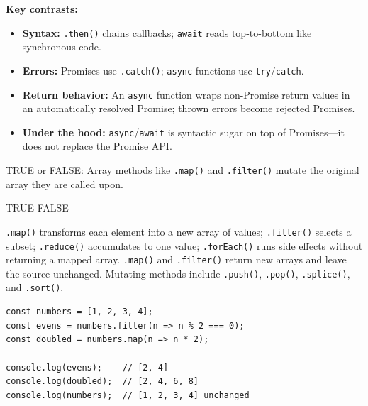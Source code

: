 \begin{solutionorbox}[4.75in]
\textbf{Key contrasts:}
\begin{itemize}
  \item \textbf{Syntax:} \lstinline[style=jsinline]|.then()| chains callbacks; \lstinline[style=jsinline]|await| reads top-to-bottom like synchronous code.
  \item \textbf{Errors:} Promises use \lstinline[style=jsinline]|.catch()|; \lstinline[style=jsinline]|async| functions use \lstinline[style=jsinline]|try|/\lstinline[style=jsinline]|catch|.
  \item \textbf{Return behavior:} An \lstinline[style=jsinline]|async| function wraps non-Promise return values in an automatically resolved Promise; thrown errors become rejected Promises.
  \item \textbf{Under the hood:} \lstinline[style=jsinline]|async|/\lstinline[style=jsinline]|await| is syntactic sugar on top of Promises---it does not replace the Promise API.
\end{itemize}
\end{solutionorbox}

\question[4]
TRUE or FALSE: Array methods like \lstinline[style=jsinline]|.map()| and \lstinline[style=jsinline]|.filter()| mutate the original array they are called upon.
\begin{choices}
  \choice TRUE
  \CorrectChoice FALSE
\end{choices}
\begin{solution}
  \lstinline[style=jsinline]|.map()| transforms each element into a new array of values; \lstinline[style=jsinline]|.filter()| selects a subset; \lstinline[style=jsinline]|.reduce()| accumulates to one value; \lstinline[style=jsinline]|.forEach()| runs side effects without returning a mapped array. \lstinline[style=jsinline]|.map()| and \lstinline[style=jsinline]|.filter()| return new arrays and leave the source unchanged. Mutating methods include \lstinline[style=jsinline]|.push()|, \lstinline[style=jsinline]|.pop()|, \lstinline[style=jsinline]|.splice()|, and \lstinline[style=jsinline]|.sort()|.
\begin{lstlisting}[style=js]
const numbers = [1, 2, 3, 4];
const evens = numbers.filter(n => n % 2 === 0);
const doubled = numbers.map(n => n * 2);

console.log(evens);    // [2, 4]
console.log(doubled);  // [2, 4, 6, 8]
console.log(numbers);  // [1, 2, 3, 4] unchanged
\end{lstlisting}
\end{solution}

